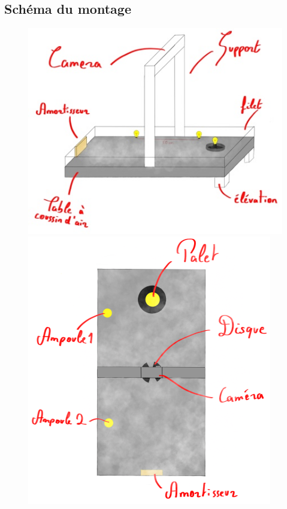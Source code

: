 \documentclass[11pt]{article}
\begin{document}
\subsection{Schéma du montage}
\begin{center}
\begin{figure}[H]
  \includegraphics[scale=0.6]{side view2.jpg}
  \includegraphics[scale=0.75]{front view.png}
  \begin{center}

\end{center}
\end{figure}
\end{center}
\end{document}
